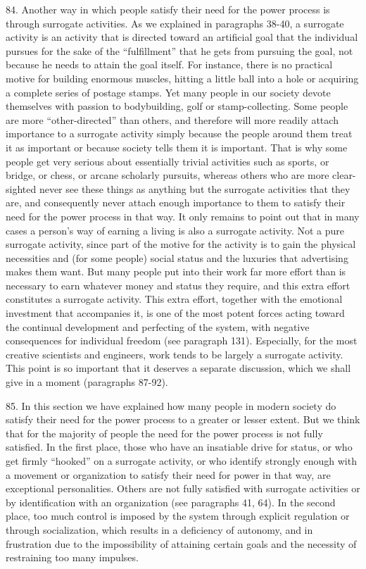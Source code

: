 \documentclass{article}
\begin{document}
84. Another way in which people satisfy their need for the power process is through surrogate 
activities. As we explained in paragraphs 38-40, a surrogate activity is an activity that is directed 
toward an artificial goal that the individual pursues for the sake of the “fulfillment” that he gets 
from pursuing the goal, not because he needs to attain the goal itself. For instance, there is no 
practical motive for building enormous muscles, hitting a little ball into a hole or acquiring a 
complete series of postage stamps. Yet many people in our society devote themselves with passion 
to bodybuilding, golf or stamp-collecting. Some people are more “other-directed” than others, and 
therefore will more readily attach importance to a surrogate activity simply because the people 
around them treat it as important or because society tells them it is important. That is why some 
people get very serious about essentially trivial activities such as sports, or bridge, or chess, or 
arcane scholarly pursuits, whereas others who are more clear-sighted never see these things as 
anything but the surrogate activities that they are, and consequently never attach enough 
importance to them to satisfy their need for the power process in that way. It only remains to point 
out that in many cases a person’s way of earning a living is also a surrogate activity. Not a pure 
surrogate activity, since part of the motive for the activity is to gain the physical necessities and 
(for some people) social status and the luxuries that advertising makes them want. But many 
people put into their work far more effort than is necessary to earn whatever money and status they 
require, and this extra effort constitutes a surrogate activity. This extra effort, together with the 
emotional investment that accompanies it, is one of the most potent forces acting toward the 
continual development and perfecting of the system, with negative consequences for individual 
freedom (see paragraph 131). Especially, for the most creative scientists and engineers, work tends 
to be largely a surrogate activity. This point is so important that it deserves a separate discussion, 
which we shall give in a moment (paragraphs 87-92). \vspace{\baselineskip}

85. In this section we have explained how many people in modern society do satisfy their need 
for the power process to a greater or lesser extent. But we think that for the majority of people the 
need for the power process is not fully satisfied. In the first place, those who have an insatiable 
drive for status, or who get firmly “hooked” on a surrogate activity, or who identify strongly 
enough with a movement or organization to satisfy their need for power in that way, are 
exceptional personalities. Others are not fully satisfied with surrogate activities or by 
identification with an organization (see paragraphs 41, 64). In the second place, too much control 
is imposed by the system through explicit regulation or through socialization, which results in a 
deficiency of autonomy, and in frustration due to the impossibility of attaining certain goals and 
the necessity of restraining too many impulses. \vspace{\baselineskip} \newpage
\end{document}

